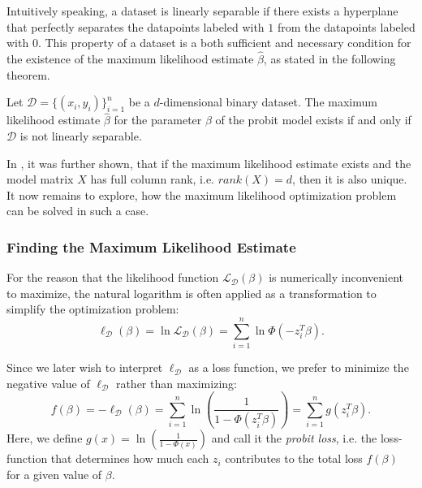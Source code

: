 \noindent Intuitively speaking, a dataset is linearly separable if there
exists a hyperplane that perfectly separates the datapoints labeled
with $1$ from the datapoints labeled with $0$.
This property of a dataset is a both sufficient and
necessary condition for the existence of the
maximum likelihood estimate $\hat{\beta}$, as stated in the following
theorem.

\begin{theorem}
    \label{theorem:probit-existence}
    Let $\mathcal{D}=\{(x_i, y_i)\}_{i=1}^n$ be a $d$-dimensional
    binary dataset.
    The maximum likelihood estimate $\hat{\beta}$ for the
    parameter $\beta$ of the probit model
    exists if and only if $\mathcal{D}$ is not linearly separable.
\end{theorem}

\noindent In \cite{haberman}, it was further shown,
that if the maximum likelihood
estimate exists and the model matrix $X$ has full column rank,
i.e. $rank(X) = d$, then it is also unique.
It now remains to explore, how the maximum likelihood optimization
problem can be solved in such a case.

\subsubsection{Finding the Maximum Likelihood Estimate}

For the reason that the likelihood function $\mathcal{L}_\mathcal{D}(\beta)$ is
numerically inconvenient to maximize, the natural logarithm is often
applied as a transformation to simplify the optimization problem:
\begin{equation}
    \ell_\mathcal{D}(\beta) = \ln \mathcal{L}_\mathcal{D}(\beta) = \sum_{i=1}^n \ln \Phi(- z_i^T \beta).
\end{equation}

\noindent Since we later wish to interpret $\ell_\mathcal{D}$ as a loss function, we prefer
to minimize the negative value of $\ell_\mathcal{D}$ rather than maximizing:
\begin{equation}
    f(\beta) = -\ell_\mathcal{D}(\beta)
    = \sum_{i=1}^n \ln \left( \frac{1}{1 - \Phi(z_i^T \beta)} \right)
    = \sum_{i=1}^n g(z_i^T \beta).
\end{equation}
Here, we define $g(x) = \ln \left(\frac{1}{1 - \Phi(x)}\right)$
and call it the \textit{probit loss}, i.e. the loss-function that
determines how much each $z_i$ contributes to the total loss $f(\beta)$
for a given value of $\beta$.

